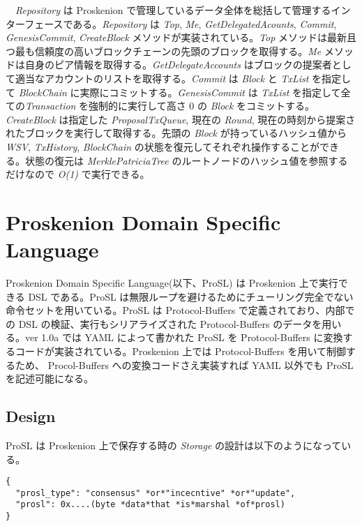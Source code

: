 　\emph{Repository} は Proskenion
で管理しているデータ全体を総括して管理するインターフェースである。\emph{Repository}
は \emph{Top}, \emph{Me}, \emph{GetDelegatedAcounts}, \emph{Commit},
\emph{GenesisCommit}, \emph{CreateBlock}
メソッドが実装されている。\emph{Top}
メソッドは最新且つ最も信頼度の高いブロックチェーンの先頭のブロックを取得する。\emph{Me}
メソッドは自身のピア情報を取得する。\emph{GetDelegateAccounts}
はブロックの提案者として適当なアカウントのリストを取得する。\emph{Commit}
は \emph{Block} と \emph{TxList} を指定して \emph{BlockChain}
に実際にコミットする。\emph{GenesisCommit} は \emph{TxList}
を指定して全ての\emph{Transaction} を強制的に実行して高さ 0 の
\emph{Block} をコミットする。\emph{CreateBlock} は指定した
\emph{ProposalTxQueue}, 現在の \emph{Round},
現在の時刻から提案されたブロックを実行して取得する。先頭の \emph{Block}
が持っているハッシュ値から \emph{WSV}, \emph{TxHistory},
\emph{BlockChain}
の状態を復元してそれぞれ操作することができる。状態の復元は
\emph{MerklePatriciaTree} のルートノードのハッシュ値を参照するだけなので
\emph{O(1)} で実行できる。

\hypertarget{proskenion-domain-specific-language}{%
\section{Proskenion Domain Specific
Language}\label{proskenion-domain-specific-language}}

Proskenion Domain Specific Language(以下、ProSL) は Proskenion
上で実行できる DSL である。ProSL
は無限ループを避けるためにチューリング完全でない命令セットを用いている。ProSL
は Protocol-Buffers で定義されており、内部での DSL
の検証、実行もシリアライズされた Protocol-Buffers のデータを用いる。ver
1.0a では YAML\cite{6} によって書かれた ProSL を Protocol-Buffers
に変換するコードが実装されている。Proskenion 上では Protocol-Buffers
を用いて制御するため、 Procol-Buffers への変換コードさえ実装すれば YAML
以外でも ProSL を記述可能になる。

\hypertarget{design}{%
\subsection{Design}\label{design}}

ProSL は Proskenion 上で保存する時の \emph{Storage}
の設計は以下のようになっている。

\begin{verbatim}
{
  "prosl_type": "consensus" *or*"incecntive" *or*"update",
  "prosl": 0x....(byte *data*that *is*marshal *of*prosl)
}
\end{verbatim}

